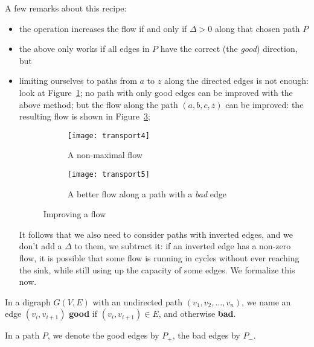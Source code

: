 A few remarks about this recipe:
\begin{itemize}
\item the operation increases the flow if and only if $\Delta > 0$
along that chosen path $P$
\item the above only works if all edges in $P$ have the correct (the
{\em good}) direction, but
\item limiting ourselves to paths from $a$ to $z$ along the directed
edges is not enough: look at Figure~\ref{transport4}; no path with
only good edges can be improved with the above method; but the flow
along the path $(a,b,c,z)$ can be improved: the resulting flow is
shown in Figure~\ref{transport5};

\begin{figure}[ht]
	\centering
	\begin{subfigure}{0.35\linewidth}
		\centering
		\texttt{[image: transport4]}
		\caption{A non-maximal flow}
		\label{transport4}
	\end{subfigure}\qquad\quad
	\begin{subfigure}{0.35\linewidth}
		\centering
		\texttt{[image: transport5]}
		\caption{A better flow along a path with a {\em bad} edge}
		\label{transport5}
	\end{subfigure}
	\caption{Improving a flow}
\end{figure}

It follows that we also need to consider paths with inverted edges,
and we don't add a $\Delta$ to them, we subtract it: if an inverted
edge has a non-zero flow, it is possible that some flow is running in
cycles without ever reaching the sink, while still using up the
capacity of some edges. We formalize this now.

\end{itemize}

 \begin{definition}
\textup{In a digraph $G(V,E)$ with an undirected path $(v_{1},v_{2},\ldots ,v_{n})$,
we name an edge $(v_{i},v_{i+1})$ \textbf{good} if $(v_{i},v_{i+1})
\in E$, and otherwise \textbf{bad}.}
\end{definition}

In a path $P$, we denote the good edges by $P_{+}$, the bad edges by $P_{-}$.

